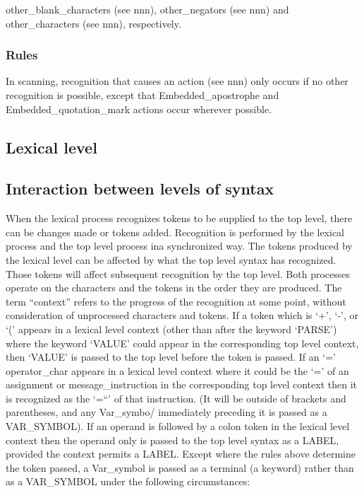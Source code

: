 other\_blank\_characters (see nnn), other\_negators (see nnn) and
other\_characters (see nnn), respectively.

\subsubsection{Rules}\label{rules}

In scanning, recognition that causes an action (see nnn) only occurs if
no other recognition is possible, except that Embedded\_apostrophe and
Embedded\_quotation\_mark actions occur wherever possible.

\subsection{Lexical level}\label{lexical-level}

\subsection{Interaction between levels of
syntax}\label{interaction-between-levels-of-syntax}

When the lexical process recognizes tokens to be supplied to the top
level, there can be changes made or tokens added. Recognition is
performed by the lexical process and the top level process ina
synchronized way. The tokens produced by the lexical level can be
affected by what the top level syntax has recognized. Those tokens will
affect subsequent recognition by the top level. Both processes operate
on the characters and the tokens in the order they are produced. The
term ``context'' refers to the progress of the recognition at some
point, without consideration of unprocessed characters and tokens. If a
token which is `+', `-', \textquotesingle{} or `(' appears in a lexical
level context (other than after the keyword `PARSE') where the keyword
`VALUE' could appear in the corresponding top level context, then
`VALUE' is passed to the top level before the token is passed. If an `='
operator\_char appears in a lexical level context where it could be the
`=' of an assignment or message\_instruction in the corresponding top
level context then it is recognized as the `=``' of that instruction.
(It will be outside of brackets and parentheses, and any Var\_symbo/
immediately preceding it is passed as a VAR\_SYMBOL). If an operand is
followed by a colon token in the lexical level context then the operand
only is passed to the top level syntax as a LABEL, provided the context
permits a LABEL. Except where the rules above determine the token
passed, a Var\_symbol is passed as a terminal (a keyword) rather than as
a VAR\_SYMBOL under the following circumstances:

